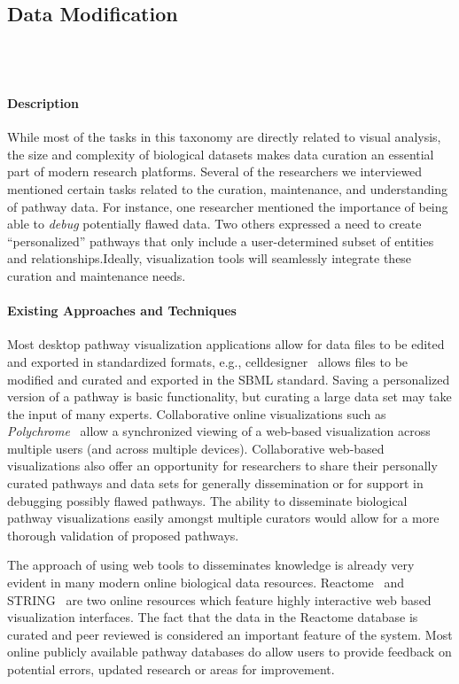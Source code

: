 \documentclass[twocolumn]{bmcart}%
\begin{document}
\subsection*{Data Modification}
\ \\ \
\paragraph*{Description}

While most of the tasks in this taxonomy are directly related to visual analysis, the size and complexity of biological datasets makes data curation an essential part of modern research platforms.
Several of the researchers we interviewed mentioned certain tasks related to the curation, maintenance, and understanding of pathway data.
For instance, one researcher mentioned the importance of being able to \emph{debug} potentially flawed data.
Two others expressed a need to create ``personalized'' pathways that only include a user-determined subset of entities and relationships.Ideally, visualization tools will seamlessly integrate these curation and maintenance needs.

\paragraph*{Existing Approaches and Techniques}
Most desktop pathway visualization applications allow for data files to be edited and exported in standardized formats, e.g., celldesigner~\cite{funahashi2008celldesigner} allows files to be modified and curated and exported in the SBML standard.
Saving a  personalized version of a pathway is basic functionality, but curating a large data set may take the input of many experts.
Collaborative online visualizations such as \textit{Polychrome}~\cite{badam2014polychrome} allow a synchronized viewing of a web-based visualization across multiple users (and across multiple devices).
Collaborative web-based visualizations also offer an opportunity for researchers to share their personally curated pathways and data sets for generally dissemination or for support in debugging possibly flawed pathways.
The ability to disseminate biological pathway visualizations easily amongst multiple curators would allow for a more thorough validation of proposed pathways.

The approach of using web tools to disseminates knowledge is already very evident in many modern online biological data resources.
Reactome~\cite{croft2014reactome} and STRING~\cite{STRING2005} are two online resources which feature highly interactive web based visualization interfaces.
The fact that the data in the Reactome database is curated and peer reviewed is considered an important feature of the system.
Most online publicly available pathway databases do allow users to provide feedback on potential errors, updated research or areas for improvement.
\end{document}
